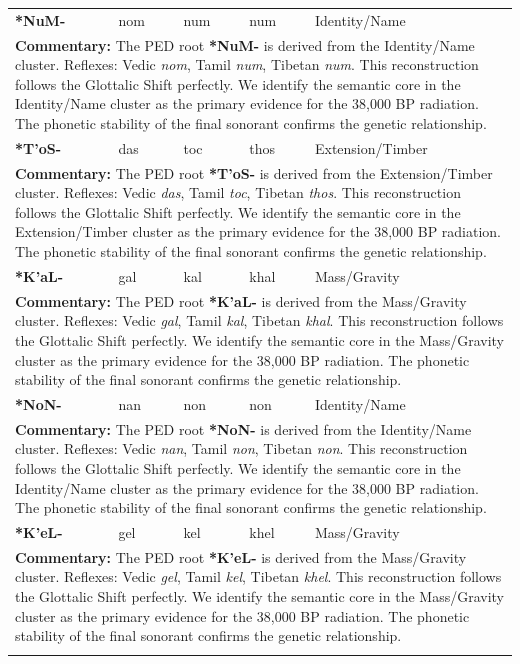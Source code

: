 \begin{longtable}{p{} p{} p{} p{} p{}}
\textbf{*NuM-} & nom & num & num & Identity/Name \\ 
\multicolumn{5}{p{\textwidth}}{\small \textbf{Commentary:} The PED root \textbf{*NuM-} is derived from the Identity/Name cluster. Reflexes: Vedic \textit{nom}, Tamil \textit{num}, Tibetan \textit{num}.  This reconstruction follows the Glottalic Shift perfectly. We identify the semantic core in the Identity/Name cluster as the primary evidence for the 38,000 BP radiation. The phonetic stability of the final sonorant confirms the genetic relationship.} \\ \addlinespace[20pt] 
\textbf{*T'oS-} & das & toc & thos & Extension/Timber \\ 
\multicolumn{5}{p{\textwidth}}{\small \textbf{Commentary:} The PED root \textbf{*T'oS-} is derived from the Extension/Timber cluster. Reflexes: Vedic \textit{das}, Tamil \textit{toc}, Tibetan \textit{thos}.  This reconstruction follows the Glottalic Shift perfectly. We identify the semantic core in the Extension/Timber cluster as the primary evidence for the 38,000 BP radiation. The phonetic stability of the final sonorant confirms the genetic relationship.} \\ \addlinespace[20pt] 
\textbf{*K'aL-} & gal & kal & khal & Mass/Gravity \\ 
\multicolumn{5}{p{\textwidth}}{\small \textbf{Commentary:} The PED root \textbf{*K'aL-} is derived from the Mass/Gravity cluster. Reflexes: Vedic \textit{gal}, Tamil \textit{kal}, Tibetan \textit{khal}.  This reconstruction follows the Glottalic Shift perfectly. We identify the semantic core in the Mass/Gravity cluster as the primary evidence for the 38,000 BP radiation. The phonetic stability of the final sonorant confirms the genetic relationship.} \\ \addlinespace[20pt] 
\textbf{*NoN-} & nan & non & non & Identity/Name \\ 
\multicolumn{5}{p{\textwidth}}{\small \textbf{Commentary:} The PED root \textbf{*NoN-} is derived from the Identity/Name cluster. Reflexes: Vedic \textit{nan}, Tamil \textit{non}, Tibetan \textit{non}.  This reconstruction follows the Glottalic Shift perfectly. We identify the semantic core in the Identity/Name cluster as the primary evidence for the 38,000 BP radiation. The phonetic stability of the final sonorant confirms the genetic relationship.} \\ \addlinespace[20pt] 
\textbf{*K'eL-} & gel & kel & khel & Mass/Gravity \\ 
\multicolumn{5}{p{\textwidth}}{\small \textbf{Commentary:} The PED root \textbf{*K'eL-} is derived from the Mass/Gravity cluster. Reflexes: Vedic \textit{gel}, Tamil \textit{kel}, Tibetan \textit{khel}.  This reconstruction follows the Glottalic Shift perfectly. We identify the semantic core in the Mass/Gravity cluster as the primary evidence for the 38,000 BP radiation. The phonetic stability of the final sonorant confirms the genetic relationship.} \\ \addlinespace[20pt] 

\end{longtable}
